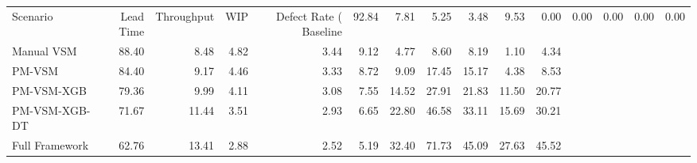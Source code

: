 \begin{tabular}{lrrrrrrrrrr}
\toprule
Scenario & Lead Time & Throughput & WIP & Defect Rate (%
\midrule
Baseline & 92.84 & 7.81 & 5.25 & 3.48 & 9.53 & 0.00 & 0.00 & 0.00 & 0.00 & 0.00 \\
Manual VSM & 88.40 & 8.48 & 4.82 & 3.44 & 9.12 & 4.77 & 8.60 & 8.19 & 1.10 & 4.34 \\
PM-VSM & 84.40 & 9.17 & 4.46 & 3.33 & 8.72 & 9.09 & 17.45 & 15.17 & 4.38 & 8.53 \\
PM-VSM-XGB & 79.36 & 9.99 & 4.11 & 3.08 & 7.55 & 14.52 & 27.91 & 21.83 & 11.50 & 20.77 \\
PM-VSM-XGB-DT & 71.67 & 11.44 & 3.51 & 2.93 & 6.65 & 22.80 & 46.58 & 33.11 & 15.69 & 30.21 \\
Full Framework & 62.76 & 13.41 & 2.88 & 2.52 & 5.19 & 32.40 & 71.73 & 45.09 & 27.63 & 45.52 \\
\bottomrule
\end{tabular}
